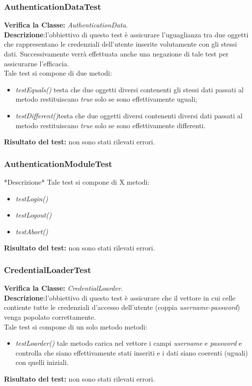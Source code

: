 \subsubsection{AuthenticationDataTest}
\textbf{Verifica la Classe:} \textit{AuthenticationData}.\\
\textbf{Descrizione}:l'obbiettivo di questo test è assicurare l'uguaglianza tra due oggetti che rappresentano le credenziali dell'utente inserite volutamente con gli stessi dati. Successivamente verrà effettuata anche una negazione di tale test per assicurarne l'efficacia.\\
Tale test si compone di due metodi:
\begin{itemize}
\item \textit{testEquals() } testa che due oggetti diversi contenenti gli stessi dati passati al metodo restituiscano \textit{true} solo se sono effettivamente uguali;
\item \textit{testDifferent()}testa che due oggetti diversi contenenti diversi dati passati al metodo restituiscano \textit{true} solo se sono effettivamente differenti.
\end{itemize}
\textbf{Risultato del test:} non sono stati rilevati errori.

\begin{table}
\end{table}

\subsubsection{AuthenticationModuleTest}
*Descrizione*
Tale test si compone di X metodi:
\begin{itemize}
\item \textit{testLogin() }
\item \textit{testLogout() }
\item \textit{testAbort() }
\end{itemize}
\textbf{Risultato del test:} non sono stati rilevati errori.

\begin{table}
\end{table}

\subsubsection{CredentialLoaderTest}
\textbf{Verifica la Classe:} \textit{CredentialLoarder}.\\
\textbf{Descrizione}:l'obbiettivo di questo test è assicurare che il vettore in cui celle contiente tutte le credenziali d'accesso dell'utente (coppia \textit{username-password}) venga popolato correttamente.\\
Tale test si compone di un solo metodo metodi:
\begin{itemize}
\item \textit{testLoarder() } tale metodo carica nel vettore i campi \textit{username} e \textit{password} e controlla che siano effettivamente stati inseriti e i dati siano coerenti (uguali) con quelli iniziali.
\end{itemize}
\textbf{Risultato del test:} non sono stati rilevati errori.


